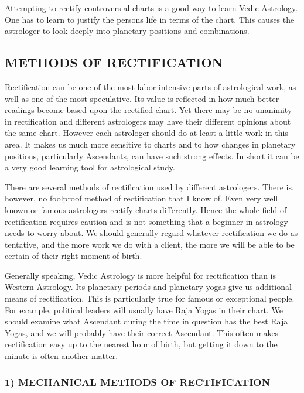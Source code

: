  

Attempting to rectify controversial charts is a good way to learn Vedic Astrology. One has to learn to justify the persons life in terms of the chart. This causes the astrologer to look deeply into planetary positions and combinations.

 

\subsection{METHODS OF RECTIFICATION}
 

Rectification can be one of the most labor-intensive parts of astrological work, as well as one of the most speculative. Its value is reflected in how much better readings become based upon the rectified chart. Yet there may be no unanimity in rectification and different astrologers may have their different opinions about the same chart. However each astrologer should do at least a little work in this area. It makes us much more sensitive to charts and to how changes in planetary positions, particularly Ascendants, can have such strong effects. In short it can be a very good learning tool for astrological study.

 

There are several methods of rectification used by different astrologers. There is, however, no foolproof method of rectification that I know of. Even very well known or famous astrologers rectify charts differently. Hence the whole field of rectification requires caution and is not something that a beginner in astrology needs to worry about. We should generally regard whatever rectification we do as tentative, and the more work we do with a client, the more we will be able to be certain of their right moment of birth.

 

Generally speaking, Vedic Astrology is more helpful for rectification than is Western Astrology. Its planetary periods and planetary yogas give us additional means of rectification. This is particularly true for famous or exceptional people. For example, political leaders will usually have Raja Yogas in their chart. We should examine what Ascendant during the time in question has the best Raja Yogas, and we will probably have their correct Ascendant. This often makes rectification easy up to the nearest hour of birth, but getting it down to the minute is often another matter.

 

\subsubsection{1) MECHANICAL METHODS OF RECTIFICATION}
 

